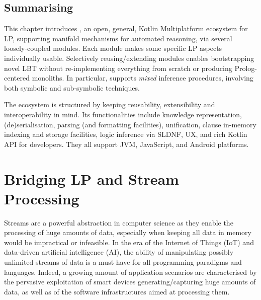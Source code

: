 \documentclass[12pt,a4paper,openright,twoside]{book}
\begin{document}

\section{Summarising}
\label{sec:conclusion}

This chapter introduces \twopkt{}, an open, general, Kotlin Multiplatform ecosystem for LP, supporting manifold mechanisms for automated reasoning, via several loosely-coupled modules.
%
Each module makes some specific LP aspects individually usable.
%
Selectively reusing/extending modules enables bootstrapping novel LBT without re-implementing everything from scratch or producing Prolog-centered monoliths.
%
In particular, \twopkt{} supports \emph{mixed} inference procedures, involving both symbolic and sub-symbolic techniques.

The \twopkt{} ecosystem is structured by keeping reusability, extensibility and interoperability in mind.
%
Its functionalities include knowledge representation, (de)serialisation, parsing (and formatting facilities), unification,
clause in-memory indexing and storage facilities, logic inference via SLDNF, UX, and rich Kotlin API for developers.
%
They all support JVM, JavaScript, and Android platforms.


\chapter{Bridging LP and Stream Processing}
\label{chap:lp-streams}


Streams are a powerful abstraction in computer science as they enable the processing of huge amounts of data, especially when keeping all data in memory would be impractical or infeasible.
%
In the era of the Internet of Things (IoT) and data-driven artificial intelligence (AI), the ability of manipulating possibly unlimited streams of data is a must-have for all programming paradigms and languages.
%
Indeed, a growing amount of application scenarios are characterised by the pervasive exploitation of smart devices generating/capturing huge amounts of data, as well as of the software infrastructures aimed at processing them.
\end{document}
